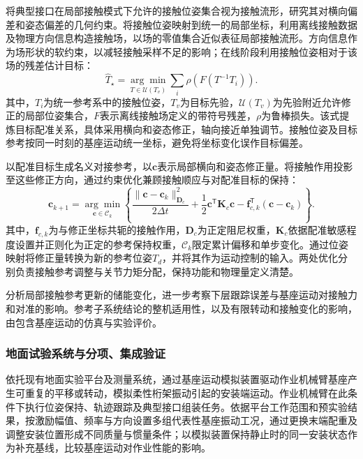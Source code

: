 将典型接口在局部接触模式下允许的接触位姿集合视为接触流形，研究其对横向偏差和姿态偏差的几何约束。将接触位姿映射到统一的局部坐标，利用离线接触数据及物理方向信息构造接触场，以场的零值集合近似表征局部接触流形。方向信息作为场形状的软约束，以减轻接触采样不足的影响；在线阶段利用接触位姿相对于该场的残差估计目标：
\begin{equation}
 \widehat T_\star=\underset{T\in\mathcal U(T_v)}{\arg\min}
 \sum_i\rho\!\left(F(T^{-1}T_i)\right).
 \label{eq:registration}
\end{equation}
其中，$T_i$为统一参考系中的接触位姿，$T_v$为目标先验，$\mathcal U(T_v)$为先验附近允许修正的局部位姿集合，$F$表示离线接触场定义的带符号残差，$\rho$为鲁棒损失。该式提炼目标配准关系，具体采用横向和姿态修正，轴向接近单独调节。接触位姿及目标参考按同一时刻的基座运动统一坐标，避免将坐标变化误作目标偏差。

以配准目标生成名义对接参考，以$\bm c$表示局部横向和姿态修正量。将接触作用投影至这些修正方向，通过约束优化兼顾接触顺应与对配准目标的保持：
\begin{equation}
 \bm c_{k+1}=\underset{\bm c\in\mathcal C_k}{\arg\min}
 \left\{\frac{\|\bm c-\bm c_k\|_{\bm D_c}^2}{2\Delta t}
 +\frac12\bm c^{\mathsf T}\bm K_c\bm c
 -\bm f_{c,k}^{\mathsf T}(\bm c-\bm c_k)\right\}.
 \label{eq:capture}
\end{equation}
其中，$\bm f_{c,k}$为与修正坐标共轭的接触作用，$\bm D_c$为正定阻尼权重，$\bm K_c$依据配准敏感程度设置并正则化为正定的参考保持权重，$\mathcal C_k$限定累计偏移和单步变化。通过位姿映射将修正量转换为新的参考位姿$T_d$，并将其作为运动控制的输入。两处优化分别负责接触参考调整与关节力矩分配，保持功能和物理量定义清楚。

分析局部接触参考更新的储能变化，进一步考察下层跟踪误差与基座运动对接触力和对准的影响。参考子系统结论的整机适用性，以及有限转动和接触变化的影响，由包含基座运动的仿真与实验评价。

\subsubsection{地面试验系统与分项、集成验证}

依托现有地面实验平台及测量系统，通过基座运动模拟装置驱动作业机械臂基座产生可重复的平移或转动，模拟柔性桁架振动引起的安装端运动。作业机械臂在此条件下执行位姿保持、轨迹跟踪及典型接口组装任务。依据平台工作范围和预实验结果，按激励幅值、频率与方向设置多组代表性基座振动工况，通过更换末端配重及调整安装位置形成不同质量与惯量条件；以模拟装置保持静止时的同一安装状态作为补充基线，比较基座运动对作业性能的影响。


